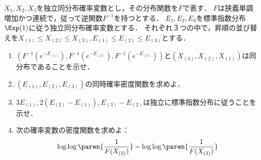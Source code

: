 \documentclass[uplatex,dvipdfmx]{jsarticle}
\begin{document}
\begin{tcolorbox}[colframe=ForestGreen, colback=ForestGreen!10!white,breakable,colbacktitle=ForestGreen!40!white,coltitle=black,fonttitle=\bfseries\sffamily,
    title=第４問]
    \begin{problem}\label{prob-20-1-4-Exp}
        $X_1,X_2,X_3$を独立同分布確率変数とし，その分布関数を$F$で表す．
        $F$は狭義単調増加かつ連続で，従って逆関数$F^{-1}$を持つとする．
        $E_1,E_2,E_3$を標準指数分布$\Exp(1)$に従う独立同分布確率変数とする．
        それぞれ３つの中で，昇順の並び替えを$X_{(1)}\le X_{(2)}\le X_{(3)},E_{(1)}\le E_{(2)}\le E_{(3)}$とする．
        \begin{enumerate}
            \item $(F^{-1}(e^{-E_{(1)}}),F^{-1}(e^{-E_{(2)}}),F^{-1}(e^{-E_{(3)}}))$と$(X_{(3)},X_{(2)},X_{(1)})$は同分布であることを示せ．
            \item $(E_{(1)},E_{(2)},E_{(3)})$の同時確率密度関数を求めよ．
            \item $3E_{(1)},2(E_{(2)}-E_{(1)}),E_{(3)}-E_{(2)}$は独立に標準指数分布に従うことを示せ．
            \item 次の確率変数の密度関数を求めよ：
            \[\log\log\paren{\frac{1}{F(X_{(2)})}}-\log\log\paren{\frac{1}{F(X_{(3)})}}\]
        \end{enumerate}
    \end{problem}
\end{tcolorbox}
\end{document}
